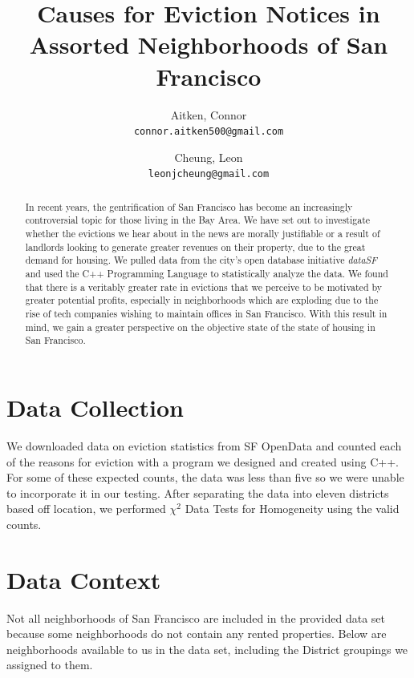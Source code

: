 \documentclass[]{article}
\title{Causes for Eviction Notices in Assorted Neighborhoods of San Francisco}
\author{
Aitken, Connor\\
\texttt{connor.aitken500@gmail.com}
\and
Cheung, Leon\\
\texttt{leonjcheung@gmail.com}
}
\begin{document}
\maketitle

\begin{abstract}
In recent years, the gentrification of San Francisco has become an increasingly controversial topic for those living in the Bay Area. We have set out to investigate whether the evictions we hear about in the news are morally justifiable or a result of landlords looking to generate greater revenues on their property, due to the great demand for housing. We pulled data from the city's open database initiative \textit{dataSF} and used the C++ Programming Language to statistically analyze the data. We found that there is a veritably greater rate in evictions that we perceive to be motivated by greater potential profits, especially in neighborhoods which are exploding due to the rise of tech companies wishing to maintain offices in San Francisco. With this result in mind, we gain a greater perspective on the objective state of the state of housing in San Francisco.
\end{abstract}

\section{Data Collection}
We downloaded data on eviction statistics from SF OpenData and counted each of the reasons for eviction with a program we designed and created using C++. For some of these expected counts, the data was less than five so we were unable to incorporate it in our testing. After separating the data into eleven districts based off location, we performed $\chi ^{2}$ Data Tests for Homogeneity using the valid counts.
\newpage
\section{Data Context}

Not all neighborhoods of San Francisco are included in the provided data set because some neighborhoods do not contain any rented properties. Below are neighborhoods available to us in the data set, including the District groupings we assigned to them.
\end{document}
